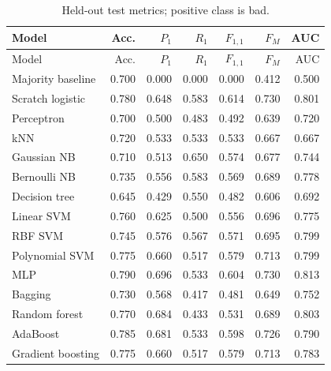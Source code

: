 \begin{longtable}{@{}p{3.6cm}rrrrrr@{}}
\caption{Held-out test metrics; positive class is bad.}\label{tab:test}\\
\toprule
Model & Acc. & $P_1$ & $R_1$ & $F_{1,1}$ & $F_M$ & AUC \\
\midrule\endfirsthead
\toprule
Model & Acc. & $P_1$ & $R_1$ & $F_{1,1}$ & $F_M$ & AUC \\
\midrule\endhead
\bottomrule\endfoot
Majority baseline & 0.700 & 0.000 & 0.000 & 0.000 & 0.412 & 0.500 \\
Scratch logistic & 0.780 & 0.648 & 0.583 & 0.614 & 0.730 & 0.801 \\
Perceptron & 0.700 & 0.500 & 0.483 & 0.492 & 0.639 & 0.720 \\
kNN & 0.720 & 0.533 & 0.533 & 0.533 & 0.667 & 0.667 \\
Gaussian NB & 0.710 & 0.513 & 0.650 & 0.574 & 0.677 & 0.744 \\
Bernoulli NB & 0.735 & 0.556 & 0.583 & 0.569 & 0.689 & 0.778 \\
Decision tree & 0.645 & 0.429 & 0.550 & 0.482 & 0.606 & 0.692 \\
Linear SVM & 0.760 & 0.625 & 0.500 & 0.556 & 0.696 & 0.775 \\
RBF SVM & 0.745 & 0.576 & 0.567 & 0.571 & 0.695 & 0.799 \\
Polynomial SVM & 0.775 & 0.660 & 0.517 & 0.579 & 0.713 & 0.799 \\
MLP & 0.790 & 0.696 & 0.533 & 0.604 & 0.730 & 0.813 \\
Bagging & 0.730 & 0.568 & 0.417 & 0.481 & 0.649 & 0.752 \\
Random forest & 0.770 & 0.684 & 0.433 & 0.531 & 0.689 & 0.803 \\
AdaBoost & 0.785 & 0.681 & 0.533 & 0.598 & 0.726 & 0.790 \\
Gradient boosting & 0.775 & 0.660 & 0.517 & 0.579 & 0.713 & 0.783 \\
\end{longtable}